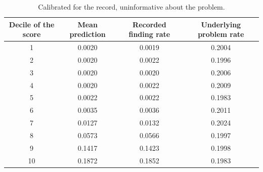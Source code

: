 \begin{table}[htbp]
\centering
\caption{Calibrated for the record, uninformative about the problem.}
\label{tab:calib}
\small
\begin{tabular}{cccc}
\toprule
Decile of the score & Mean prediction & Recorded finding rate & Underlying problem rate \\
\midrule
1 & 0.0020 & 0.0019 & 0.2004 \\
2 & 0.0020 & 0.0022 & 0.1996 \\
3 & 0.0020 & 0.0020 & 0.2006 \\
4 & 0.0020 & 0.0022 & 0.2009 \\
5 & 0.0022 & 0.0022 & 0.1983 \\
6 & 0.0035 & 0.0036 & 0.2011 \\
7 & 0.0127 & 0.0132 & 0.2024 \\
8 & 0.0573 & 0.0566 & 0.1997 \\
9 & 0.1417 & 0.1423 & 0.1998 \\
10 & 0.1872 & 0.1852 & 0.1983 \\
\bottomrule
\end{tabular}
\end{table}
